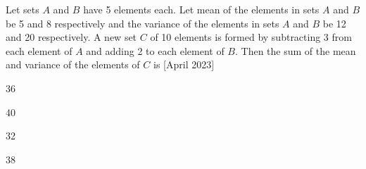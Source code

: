 \bigskip
\item Let sets $A$ and $B$ have 5 elements each. Let mean of the elements in sets $A$ and $B$ be 5 and 8 respectively and the variance of the elements in sets $A$ and $B$ be 12 and 20 respectively. A new set $C$ of 10 elements is formed by subtracting 3 from each element of $A$ and adding 2 to each element of $B$. Then the sum of the mean and variance of the elements of $C$ is \hfill{[April 2023]}
 \begin{enumerate}
    \begin{multicols}{4}
    \item 36
    \item 40
    \item 32
    \item 38
    \end{multicols}
        \end{enumerate}
\bigskip


